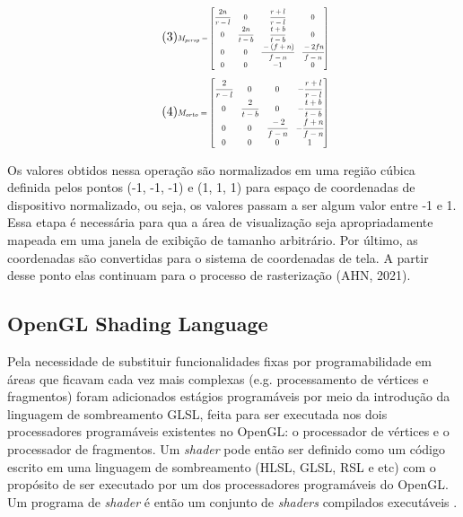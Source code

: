 	\begin{equation} \label{eq-persp} \tag{3}
		\resizebox{.35\hsize}{!}{$ M_{persp}
		=
		\begin{bmatrix} 
			\cfrac{2n}{r-l} & 0 & \cfrac{r+l}{r-l} & 0 \\
			0 & \cfrac{2n}{t-b} & \cfrac{t+b}{t-b} & 0 \\
			0 & 0 & \cfrac{-(f+n)}{f-n} & \cfrac{-2fn}{f-n}\\
			0 & 0 & -1 & 0 \\
		\end{bmatrix} $}
	\end{equation}
	\begin{equation} \label{eq-ortho} \tag{4}
		\resizebox{.35\hsize}{!}{$ M_{orto}
		=
		\begin{bmatrix}
			\cfrac{2}{r-l} & 0 & 0 & -\cfrac{r+l}{r-l} \\
			0 & \cfrac{2}{t-b} & 0 & -\cfrac{t+b}{t-b} \\
			0 & 0 & \cfrac{-2}{f-n} & -\cfrac{f+n}{f-n}\\
			0 & 0 & 0 & 1 \\
		\end{bmatrix} $}
	\end{equation}

Os valores obtidos nessa operação são normalizados em uma região cúbica definida pelos pontos (-1, -1, -1) e (1, 1, 1) para espaço de coordenadas de dispositivo normalizado, ou seja, os valores passam a ser algum valor entre -1 e 1. Essa etapa é necessária para qua a área de visualização seja apropriadamente mapeada em uma janela de exibição de tamanho arbitrário. Por último, as coordenadas são convertidas para o sistema de coordenadas de tela. A partir desse ponto elas continuam para o processo de rasterização (AHN, 2021)\nocite{openglOnline}. 

\subsection{OpenGL Shading Language}
\label{sec:glsl}

Pela necessidade de substituir funcionalidades fixas por programabilidade em áreas que ficavam cada vez mais complexas (e.g. processamento de vértices e fragmentos) foram adicionados estágios programáveis por meio da introdução da linguagem de sombreamento \acrshort{GLSL}, feita para ser executada nos dois processadores programáveis existentes no OpenGL: o processador de vértices e o processador de fragmentos. Um \textit{shader} pode então ser definido como um código escrito em uma linguagem de sombreamento (HLSL, GLSL, RSL e etc) com o propósito de ser executado por um dos processadores programáveis do OpenGL. Um programa de \textit{shader} é então um conjunto de \textit{shaders} compilados executáveis \cite{GLSLBook}. 

